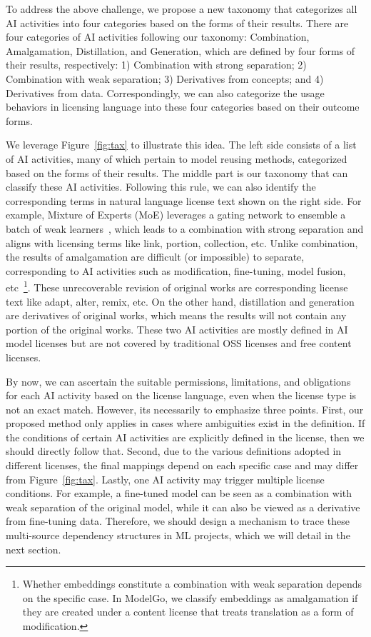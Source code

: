 To address the above challenge, we propose a new taxonomy that categorizes all AI activities into four categories based on the forms of their results. 
There are four categories of AI activities following our taxonomy: Combination, Amalgamation, Distillation, and Generation, which are defined by four forms of their results, respectively: 1) Combination with strong separation; 2) Combination with weak separation; 3) Derivatives from concepts; and 4) Derivatives from data.
Correspondingly, we can also categorize the usage behaviors in licensing language into these four categories based on their outcome forms.

We leverage Figure~\ref{fig:tax} to illustrate this idea.
The left side consists of a list of AI activities, many of which pertain to model reusing methods, categorized based on the forms of their results.
The middle part is our taxonomy that can classify these AI activities.
Following this rule, we can also identify the corresponding terms in natural language license text shown on the right side.
For example, Mixture of Experts (MoE) leverages a gating network to ensemble a batch of weak learners~\cite{jacobs1991adaptive}, which leads to a combination with strong separation and aligns with licensing terms like link, portion, collection, etc.
Unlike combination, the results of amalgamation are difficult (or impossible) to separate, corresponding to AI activities such as modification, fine-tuning, model fusion, etc~\footnote{Whether embeddings constitute a combination with weak separation depends on the specific case. In ModelGo, we classify embeddings as amalgamation if they are created under a content license that treats translation as a form of modification.}. 
These unrecoverable revision of original works are corresponding license text like adapt, alter, remix, etc.
On the other hand, distillation and generation are derivatives of original works, which means the results will not contain any portion of the original works. 
These two AI activities are mostly defined in AI model licenses but are not covered by traditional OSS licenses and free content licenses.

By now, we can ascertain the suitable permissions, limitations, and obligations for each AI activity based on the license language, even when the license type is not an exact match.
However, its necessarily to emphasize three points.
First, our proposed method only applies in cases where ambiguities exist in the definition. 
If the conditions of certain AI activities are explicitly defined in the license, then we should directly follow that.
Second, due to the various definitions adopted in different licenses, the final mappings depend on each specific case and may differ from Figure~\ref{fig:tax}.
Lastly, one AI activity may trigger multiple license conditions. For example, a fine-tuned model can be seen as a combination with weak separation of the original model, while it can also be viewed as a derivative from fine-tuning data.
Therefore, we should design a mechanism to trace these multi-source dependency structures in ML projects, which we will detail in the next section.
 
